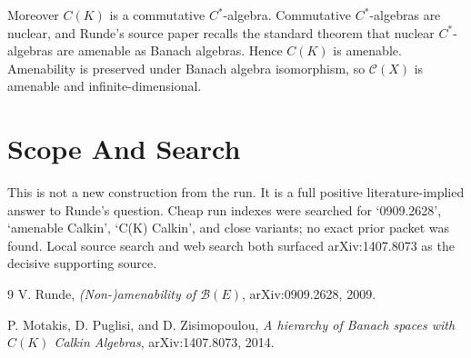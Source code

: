 \documentclass[11pt]{article}
\begin{document}
Moreover \(C(K)\) is a commutative \(C^*\)-algebra.  Commutative
\(C^*\)-algebras are nuclear, and Runde's source paper recalls the
standard theorem that nuclear \(C^*\)-algebras are amenable as Banach
algebras.  Hence \(C(K)\) is amenable.  Amenability is preserved under
Banach algebra isomorphism, so \(\mathcal C(X)\) is amenable and
infinite-dimensional.

\section*{Scope And Search}

This is not a new construction from the run.  It is a full positive
literature-implied answer to Runde's question.  Cheap run indexes were
searched for `0909.2628', `amenable Calkin', `C(K) Calkin', and close
variants; no exact prior packet was found.  Local source search and web
search both surfaced arXiv:1407.8073 as the decisive supporting source.

\begin{thebibliography}{9}
V. Runde,
\emph{(Non-)amenability of \(\mathcal B(E)\)},
arXiv:0909.2628, 2009.

P. Motakis, D. Puglisi, and D. Zisimopoulou,
\emph{A hierarchy of Banach spaces with \(C(K)\) Calkin Algebras},
arXiv:1407.8073, 2014.
\end{thebibliography}
\end{document}
